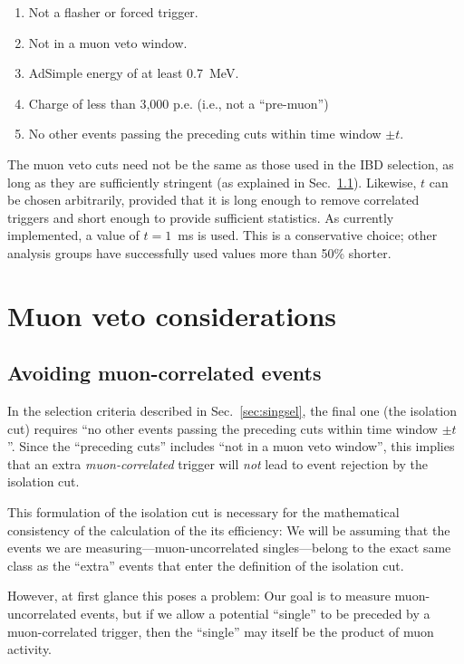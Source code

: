 \documentclass[../thesis.tex]{subfiles}
\begin{document}
\begin{enumerate}
\item Not a flasher or forced trigger.
\item Not in a muon veto window.
\item AdSimple energy of at least 0.7~MeV.
\item Charge of less than 3,000 p.e. (i.e., not a ``pre-muon'')
\item No other events passing the preceding cuts within time window $\pm t$.
\end{enumerate}

The muon veto cuts need not be the same as those used in the IBD selection, as long as they are sufficiently stringent (as explained in Sec.~\ref{sec:avoidmuoncorr}).  Likewise, $t$ can be chosen arbitrarily, provided that it is long enough to remove correlated triggers and short enough to provide sufficient statistics. As currently implemented, a value of $t = 1$~ms is used. This is a conservative choice; other analysis groups have successfully used values more than 50\% shorter.

\section{Muon veto considerations}
\label{sec:muonventoconsider}

\subsection{Avoiding muon-correlated events}
\label{sec:avoidmuoncorr}

In the selection criteria described in Sec.~\ref{sec:singsel}, the final one  (the isolation cut) requires ``no other events passing the preceding cuts within time window $\pm t$''. Since the ``preceding cuts'' includes ``not in a muon veto window'', this implies that an extra \emph{muon-correlated} trigger will \emph{not} lead to event rejection by the isolation cut.

This formulation of the isolation cut is necessary for the mathematical consistency of the calculation of the its efficiency: We will be assuming that the events we are measuring---muon-uncorrelated singles---belong to the exact same class as the ``extra'' events that enter the definition of the isolation cut.

However, at first glance this poses a problem: Our goal is to measure muon-uncorrelated events, but if we allow a potential ``single'' to be preceded by a muon-correlated trigger, then the ``single'' may itself be the product of muon activity. 
\end{document}
